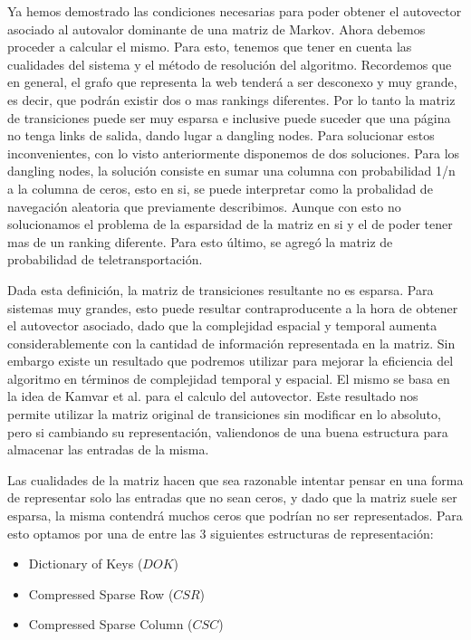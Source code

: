 Ya hemos demostrado las condiciones necesarias para poder obtener el autovector asociado al autovalor dominante de una matriz de Markov. 
Ahora debemos proceder a calcular el mismo. Para esto, tenemos que tener en cuenta las cualidades del sistema y el método de resolución del algoritmo. Recordemos que en general, el grafo que representa la web tenderá a ser desconexo y muy grande, es decir, que podrán existir dos o mas rankings diferentes. Por lo tanto la matriz 
de transiciones puede ser muy esparsa e inclusive puede suceder que una página no tenga links de salida, dando lugar a dangling nodes. Para solucionar estos inconvenientes, con lo visto anteriormente disponemos de dos soluciones. Para los dangling nodes, la solución consiste en sumar una columna con probabilidad 1/n a la columna de ceros, esto en si, se puede interpretar como la probalidad de navegación aleatoria que previamente describimos. Aunque con esto no solucionamos el problema de la esparsidad de la matriz en si y el de poder tener mas de un ranking diferente. Para esto último, se agregó la matriz de probabilidad de teletransportación.

Dada esta definición, la matriz de transiciones resultante no es esparsa. 
Para sistemas muy grandes, esto puede resultar contraproducente a la hora de obtener el autovector asociado, dado que la complejidad espacial y temporal aumenta  considerablemente con la cantidad de información representada en la matriz. Sin embargo existe un resultado que podremos utilizar para mejorar la eficiencia del algoritmo en términos de complejidad temporal y espacial. El mismo se basa en la idea de Kamvar et al. \cite[Algoritmo 1]{Kamvar2003} para el calculo del autovector. Este resultado nos permite utilizar la matriz original de transiciones sin modificar en lo absoluto, pero si cambiando su representación, valiendonos de una buena estructura para almacenar las entradas de la misma. 

Las cualidades de la matriz hacen que sea razonable intentar pensar en una forma de representar solo las entradas que no sean ceros, y dado que la matriz suele ser esparsa, la misma contendrá muchos ceros que podrían no ser representados. Para esto optamos por una de entre las 3 siguientes estructuras de representación:

\begin{itemize}
\item Dictionary of Keys ($DOK$)

\item Compressed Sparse Row ($CSR$)

\item Compressed Sparse Column ($CSC$)
\end{itemize}

